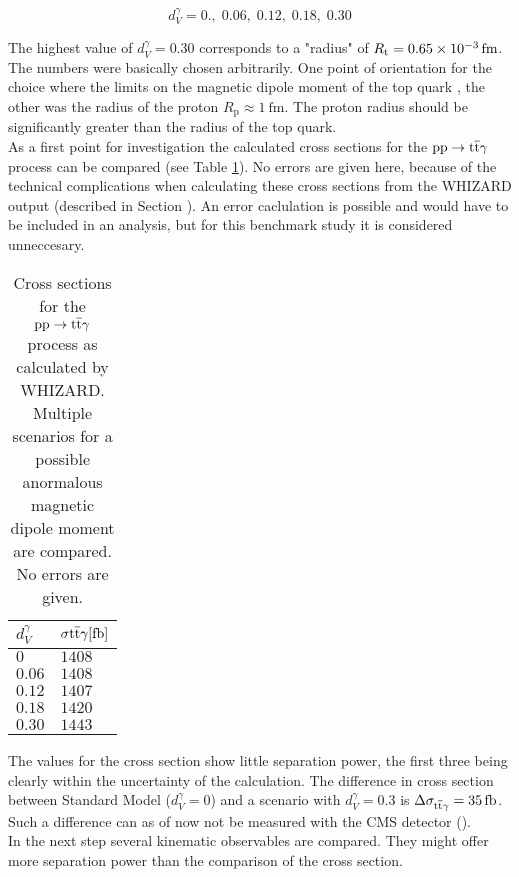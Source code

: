 \begin{equation}
d_V^{\gamma} = 0.,\; 0.06,\; 0.12,\; 0.18,\; 0.30
\label{eq_ano_val}
\end{equation}

The highest value of $d_V^{\gamma} = 0.30$ corresponds to a "radius" of $R_{\mathrm{t}} = \SI{0.65d-3}{\femto \meter}$. The numbers were basically chosen arbitrarily. One point of orientation for the choice where the limits on the magnetic dipole moment of the top quark , the other was the radius of the proton $R_{\mathrm{p}} \approx \SI{1}{\femto \meter}$. The proton radius should be significantly greater than the radius of the top quark. \\
As a first point for investigation the calculated cross sections for the $\mathrm{pp} \to \mathrm{t}\overline{\mathrm{t}} \gamma $ process can be compared (see Table \ref{tab_ano_crosssec}). No errors are given here, because of the technical complications when calculating these cross sections from the WHIZARD output (described in Section ). An error caclulation is possible and would have to be included in an analysis, but for this benchmark study it is considered unneccesary.

\begin{table}[ht]
\centering
    \caption{Cross sections for the $\mathrm{pp} \to \mathrm{t}\overline{\mathrm{t}} \gamma$ process as calculated by WHIZARD. Multiple scenarios for a possible anormalous magnetic dipole moment are compared. No errors are given.}
    \begin{tabular}{| l | l |}

    \hline
    $d_{V}^{\gamma}$ & $\sigma{\ttgamma} [\SI{}{\femto \barn}]$ \\
    \hline
    $0$ &  $1408$\\
    \hline
    $0.06$ & $1408 $ \\
    \hline
    $0.12$ & $1407 $ \\
    \hline
    $0.18$ & $1420 $ \\
    \hline
    $0.30$ &  $1443 $\\
    \hline
    \end{tabular}
     \label{tab_ano_crosssec}
\end{table}

The values for the cross section show little separation power, the first three being clearly within the uncertainty of the calculation. The difference in cross section between Standard Model ($d_V^{\gamma} = 0$)  and a scenario with $d_V^{\gamma} = 0.3$ is $\Delta \sigma_{\ttgamma} = \SI{35}{\femto \barn}$. Such a difference can as of now not be measured with the CMS detector  ().\\
In the next step several kinematic observables are compared. They might offer more separation power than the comparison of the cross section.

